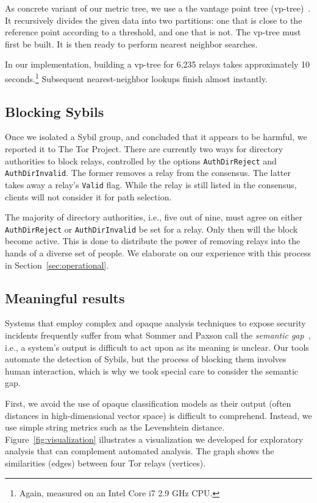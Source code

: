 As concrete variant of our metric tree, we use a the vantage point tree
(vp-tree)~\cite{Yianilos1993a}.  It recursively divides the given data into two
partitions: one that is close to the reference point according to a threshold,
and one that is not.  The vp-tree must first be built.
It is then ready to perform nearest neighbor
searches.

In our implementation, building a vp-tree for 6,235 relays takes approximately
10 seconds.\footnote{Again, measured on an Intel Core i7 2.9 GHz CPU.}
Subsequent nearest-neighbor lookups finish almost instantly.


\subsection{Blocking Sybils}
Once we isolated a Sybil group, and concluded that it appears to be harmful, we
reported it to The Tor Project.  There are currently two ways for directory
authorities to block relays, controlled by the options \texttt{AuthDirReject}
and \texttt{AuthDirInvalid}.  The former removes a relay from the consensus.
The latter takes away a relay's \texttt{Valid} flag.  While the relay is still
listed in the consensus, clients will not consider it for path selection.

The majority of directory authorities, i.e., five out of nine, must agree on
either \texttt{AuthDirReject} or \texttt{AuthDirInvalid} be set for a relay.
Only then will the block become active.  This is done to distribute the power
of removing relays into the hands of a diverse set of people.  We elaborate on
our experience with this process in Section~\ref{sec:operational}.

\subsection{Meaningful results}
Systems that employ complex and opaque analysis techniques to expose security
incidents frequently suffer from what Sommer and Paxson call the \emph{semantic
gap}~\cite[\S III.C]{Sommer2010a}, i.e., a system's output is difficult to act
upon as its meaning is unclear.  Our tools automate the detection of Sybils,
but the process of blocking them involves human interaction, which is why we
took special care to consider the semantic gap.

First, we avoid the use of opaque classification models as their output (often
distances in high-dimensional vector space) is difficult to comprehend.
Instead, we use simple string metrics such as the Levenshtein distance.
Figure~\ref{fig:visualization} illustrates a visualization we developed for
exploratory analysis that can complement automated analysis.  The graph shows
the similarities (edges) between four Tor relays (vertices).

